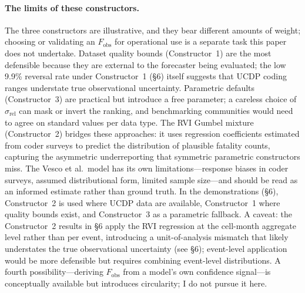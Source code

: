 \paragraph{The limits of these constructors.}
The three constructors are illustrative, and they bear different amounts of weight; choosing or validating an $F_\text{obs}$ for operational use is a separate task this paper does not undertake. Dataset quality bounds (Constructor~1) are the most defensible because they are external to the forecaster being evaluated; the low 9.9\% reversal rate under Constructor~1 (\S6) itself suggests that UCDP coding ranges understate true observational uncertainty. Parametric defaults (Constructor~3) are practical but introduce a free parameter; a careless choice of $\sigma_\text{rel}$ can mask or invert the ranking, and benchmarking communities would need to agree on standard values per data type. The RVI Gumbel mixture (Constructor~2) bridges these approaches: it uses regression coefficients estimated from coder surveys \citep{vesco2026uncertainty} to predict the distribution of plausible fatality counts, capturing the asymmetric underreporting that symmetric parametric constructors miss. The Vesco et al.\ model has its own limitations---response biases in coder surveys, assumed distributional form, limited sample size---and should be read as an informed estimate rather than ground truth. In the demonstrations (\S6), Constructor~2 is used where UCDP data are available, Constructor~1 where quality bounds exist, and Constructor~3 as a parametric fallback. A caveat: the Constructor~2 results in \S6 apply the RVI regression at the cell-month aggregate level rather than per event, introducing a unit-of-analysis mismatch that likely understates the true observational uncertainty (see \S6); event-level application would be more defensible but requires combining event-level distributions. A fourth possibility---deriving $F_\text{obs}$ from a model's own confidence signal---is conceptually available but introduces circularity; I do not pursue it here.

